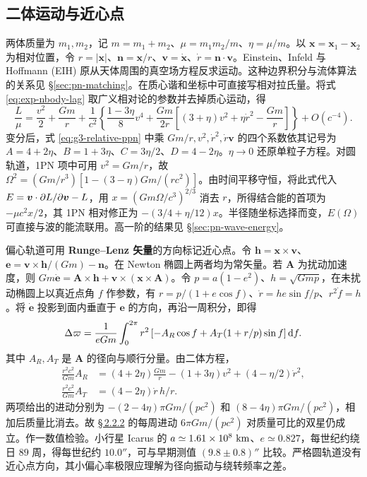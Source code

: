 \subsection{二体运动与近心点}\label{sec:pn-peri}

两体质量为 $m_1,m_2$，记 $m=m_1+m_2$、$\mu=m_1m_2/m$、$\eta=\mu/m$。以 $\bm x=\bm x_1-\bm x_2$ 为相对位置，令 $r=|\bm x|$、$\bm n=\bm x/r$、$\bm v=\dot{\bm x}$、$\dot r=\bm n\cdot\bm v$。Einstein、Infeld 与 Hoffmann (EIH) 原从天体周围的真空场方程反求运动。这种边界积分与流体算法的关系见 \S\ref{sec:pn-matching}。在质心谐和坐标中可直接写相对拉氏量。将式 \eqref{eq:exp-nbody-lag} 取广义相对论的参数并去掉质心运动，得
\begin{equation}\label{eq:exp-rel-L}
 \frac{L}{\mu}=\frac{v^2}{2}+\frac{Gm}{r}
 +\frac{1}{c^2}\left\{\frac{1-3\eta}{8}v^4+
 \frac{Gm}{2r}\left[(3+\eta)v^2+\eta\dot r^2-\frac{Gm}{r}\right]\right\}
 +O(c^{-4}).
\end{equation}
变分后，式 \eqref{eq:g3-relative-ppn} 中乘 $Gm/r,v^2,\dot r^2,\dot r\bm v$ 的四个系数依其记号为 $A=4+2\eta$、$B=1+3\eta$、$C=3\eta/2$、$D=4-2\eta$。$\eta\to0$ 还原单粒子方程。对圆轨道，1PN 项中可用 $v^2=Gm/r$，故 $\Omega^2=(Gm/r^3)[1-(3-\eta)Gm/(rc^2)]$。由时间平移守恒，将此式代入 $E=\bm v\cdot\partial L/\partial\bm v-L$，用 $x=(Gm\Omega/c^3)^{2/3}$ 消去 $r$，所得结合能的首项为 $-\mu c^2 x/2$，其 1PN 相对修正为 $-(3/4+\eta/12)x$。半径随坐标选择而变，$E(\Omega)$ 可直接与波的能流联用。高一阶的结果见 \S\ref{sec:pn-wave-energy}。

偏心轨道可用 \textbf{Runge--Lenz 矢量}的方向标记近心点。令 $\bm h=\bm x\times\bm v$、$\bm e=\bm v\times\bm h/(Gm)-\bm n$。在 Newton 椭圆上两者均为常矢量。若 $\bm A$ 为扰动加速度，则 $Gm\dot{\bm e}=\bm A\times\bm h+\bm v\times(\bm x\times\bm A)$。令 $p=a(1-e^2)$、$h=\sqrt{Gmp}$，在未扰动椭圆上以真近点角 $f$ 作参数，有 $r=p/(1+e\cos f)$、$\dot r=he\sin f/p$、$r^2\dot f=h$。将 $\dot{\bm e}$ 投影到面内垂直于 $\bm e$ 的方向，再沿一周积分，即得
\begin{equation}\label{eq:pn-apsis-integral}
 \Delta\varpi=\frac{1}{eGm}\int_0^{2\pi}r^2
 \left[-A_R\cos f+A_T(1+r/p)\sin f\right]\dd f .
\end{equation}
其中 $A_R,A_T$ 是 $\bm A$ 的径向与顺行分量。由二体方程，
\begin{align*}
 \frac{r^2c^2}{Gm}A_R&=(4+2\eta)\frac{Gm}{r}-(1+3\eta)v^2
                              +(4-\eta/2)\dot r^2,\\
 \frac{r^2c^2}{Gm}A_T&=(4-2\eta)\dot r\,h/r .
\end{align*}
两项给出的进动分别为 $-(2-4\eta)\pi Gm/(pc^2)$ 和 $(8-4\eta)\pi Gm/(pc^2)$，相加后质量比消去。故 \hyperlink{subsection.2.2.2}{\S\,2.2.2} 的每周进动 $6\pi Gm/(pc^2)$ 对质量可比的双星仍成立。作一数值检验。小行星 Icarus 的 $a\simeq1.61\times10^8\ {\rm km}$、$e\simeq0.827$，每世纪约绕日 $89$ 周，得每世纪约 $10.0''$，可与早期测值 $(9.8\pm0.8)''$ 比较。严格圆轨道没有近心点方向，其小偏心率极限应理解为径向振动与绕转频率之差。

